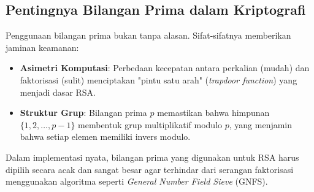 \subsection{Pentingnya Bilangan Prima dalam Kriptografi}

Penggunaan bilangan prima bukan tanpa alasan. Sifat-sifatnya memberikan jaminan keamanan:
\begin{itemize}
    \item \textbf{Asimetri Komputasi}: Perbedaan kecepatan antara perkalian (mudah) dan faktorisasi (sulit) menciptakan "pintu satu arah" (\textit{trapdoor function}) yang menjadi dasar RSA.
    \item \textbf{Struktur Grup}: Bilangan prima $p$ memastikan bahwa himpunan $\{1, 2, \dots, p-1\}$ membentuk grup multiplikatif modulo $p$, yang menjamin bahwa setiap elemen memiliki invers modulo.
\end{itemize}

\begin{catatan}
Dalam implementasi nyata, bilangan prima yang digunakan untuk RSA harus dipilih secara acak dan sangat besar agar terhindar dari serangan faktorisasi menggunakan algoritma seperti \textit{General Number Field Sieve} (GNFS).
\end{catatan}
